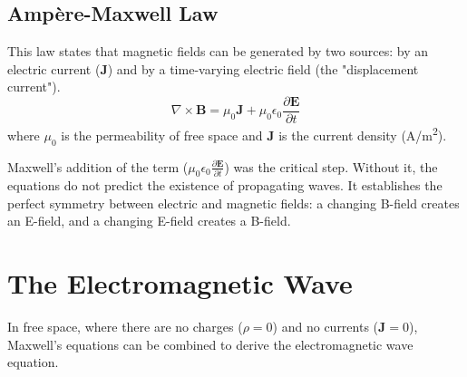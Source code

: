 \subsection{Ampère-Maxwell Law}
This law states that magnetic fields can be generated by two sources: by an electric current ($\mathbf{J}$) and by a time-varying electric field (the "displacement current").
\begin{equation}
    \nabla \times \mathbf{B} = \mu_0 \mathbf{J} + \mu_0 \epsilon_0 \frac{\partial \mathbf{E}}{\partial t}
    \label{eq:ampere_maxwell}
\end{equation}
where $\mu_0$ is the permeability of free space and $\mathbf{J}$ is the current density (\unit{A/m^2}).

\begin{warningbox}
    Maxwell's addition of the  term ($\mu_0 \epsilon_0 \frac{\partial \mathbf{E}}{\partial t}$) was the critical step. Without it, the equations do not predict the existence of propagating waves. It establishes the perfect symmetry between electric and magnetic fields: a changing B-field creates an E-field, and a changing E-field creates a B-field.
\end{warningbox}

\section{The Electromagnetic Wave}

In free space, where there are no charges ($\rho=0$) and no currents ($\mathbf{J}=0$), Maxwell's equations can be combined to derive the electromagnetic wave equation.

